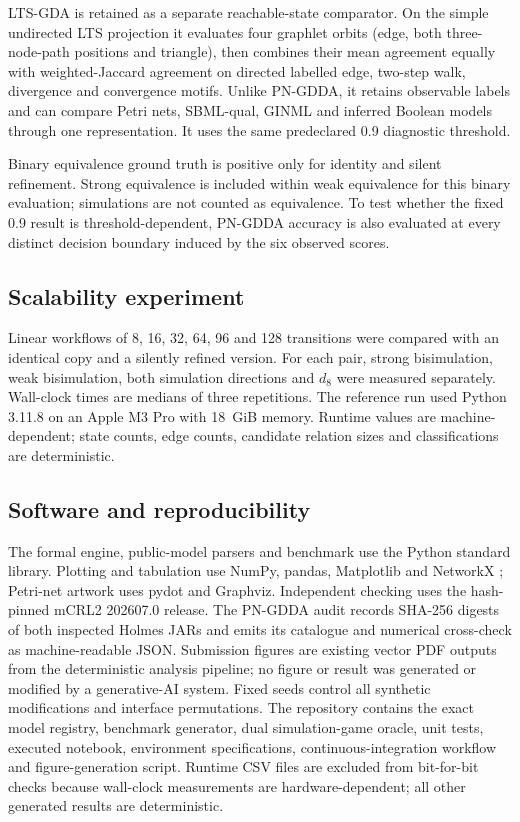 \documentclass[JMCS,submit]{resources/ISRP}
\theoremstyle{definition}
\theoremstyle{remark}
\numberwithin{equation}{section}
\begin{document}
LTS-GDA is retained as a separate reachable-state comparator. On the simple
undirected LTS projection it evaluates four graphlet orbits (edge, both
three-node-path positions and triangle), then combines their mean agreement
equally with weighted-Jaccard agreement on directed labelled edge, two-step walk,
divergence and convergence motifs. Unlike PN-GDDA, it retains observable labels
and can compare Petri nets, SBML-qual, GINML and inferred Boolean models through
one representation. It uses the same predeclared 0.9 diagnostic threshold.

Binary equivalence ground truth is positive only for identity and silent
refinement. Strong equivalence is included within weak equivalence for this
binary evaluation; simulations are not counted as equivalence. To test whether
the fixed 0.9 result is threshold-dependent, PN-GDDA accuracy is also evaluated
at every distinct decision boundary induced by the six observed scores.

\subsection{Scalability experiment}\label{sec:scalability-method}

Linear workflows of 8, 16, 32, 64, 96 and 128 transitions were compared with an
identical copy and a silently refined version. For each pair, strong bisimulation,
weak bisimulation, both simulation directions and $d_8$ were measured separately.
Wall-clock times are medians of three repetitions. The reference run used Python
3.11.8 on an Apple M3 Pro with 18~GiB memory. Runtime values are machine-dependent;
state counts, edge counts, candidate relation sizes and classifications are
deterministic.

\subsection{Software and reproducibility}\label{sec:repro-method}

The formal engine, public-model parsers and benchmark use the Python standard
library. Plotting and tabulation use NumPy, pandas, Matplotlib and NetworkX
\cite{Hagberg2008};
Petri-net artwork uses pydot and Graphviz. Independent checking uses the
hash-pinned mCRL2 202607.0 release. The PN-GDDA audit records SHA-256 digests of
both inspected Holmes JARs and emits its catalogue and numerical cross-check as
machine-readable JSON. Submission figures are existing vector PDF outputs from
the deterministic analysis pipeline; no figure or result was generated or
modified by a generative-AI system. Fixed seeds control all synthetic
modifications and interface permutations. The repository contains the exact
model registry, benchmark generator, dual simulation-game oracle, unit tests,
executed notebook, environment specifications, continuous-integration workflow
and figure-generation script. Runtime CSV files are excluded from bit-for-bit
checks because wall-clock measurements are hardware-dependent; all other
generated results are deterministic.
\end{document}
